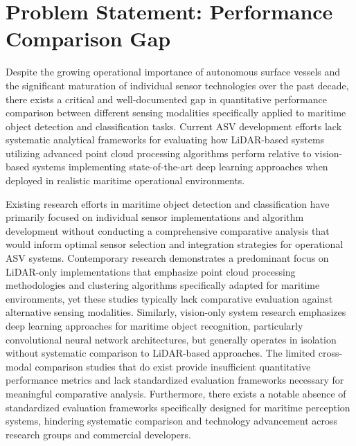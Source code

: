 \documentclass{erauthesis}
\begin{document}
\section{Problem Statement: Performance Comparison Gap} \label{problem_statement1}

Despite the growing operational importance of autonomous surface vessels and the significant maturation of individual sensor technologies over the past decade, there exists a critical and well-documented gap in quantitative performance comparison between different sensing modalities specifically applied to maritime object detection and classification tasks. Current \ac{ASV} development efforts lack systematic analytical frameworks for evaluating how \ac{LiDAR}-based systems utilizing advanced point cloud processing algorithms perform relative to vision-based systems implementing state-of-the-art deep learning approaches when deployed in realistic maritime operational environments.

Existing research efforts in maritime object detection and classification have primarily focused on individual sensor implementations and algorithm development without conducting a comprehensive comparative analysis that would inform optimal sensor selection and integration strategies for operational \ac{ASV} systems. Contemporary research demonstrates a predominant focus on \ac{LiDAR}-only implementations that emphasize point cloud processing methodologies and clustering algorithms specifically adapted for maritime environments, yet these studies typically lack comparative evaluation against alternative sensing modalities. Similarly, vision-only system research emphasizes deep learning approaches for maritime object recognition, particularly convolutional neural network architectures, but generally operates in isolation without systematic comparison to \ac{LiDAR}-based approaches. The limited cross-modal comparison studies that do exist provide insufficient quantitative performance metrics and lack standardized evaluation frameworks necessary for meaningful comparative analysis. Furthermore, there exists a notable absence of standardized evaluation frameworks specifically designed for maritime perception systems, hindering systematic comparison and technology advancement across research groups and commercial developers.
\end{document}

